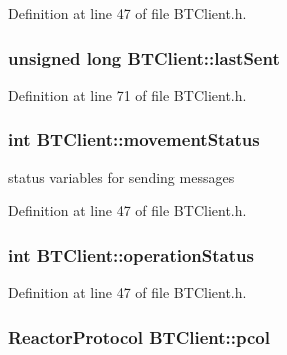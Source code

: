 Definition at line 47 of file B\-T\-Client.\-h.

\hypertarget{classBTClient_a946cc60b431ec813642b97b0c4b76cf3}{
\subsubsection[{last\-Sent}]{\setlength{\rightskip}{0pt plus 5cm}unsigned long B\-T\-Client\-::last\-Sent\hspace{0.3cm}{\ttfamily [private]}}}\label{classBTClient_a946cc60b431ec813642b97b0c4b76cf3}


Definition at line 71 of file B\-T\-Client.\-h.

\hypertarget{classBTClient_aacff467239e0a6a85eab0ac77dbcfdf8}{
\subsubsection[{movement\-Status}]{\setlength{\rightskip}{0pt plus 5cm}int B\-T\-Client\-::movement\-Status}}\label{classBTClient_aacff467239e0a6a85eab0ac77dbcfdf8}


status variables for sending messages 



Definition at line 47 of file B\-T\-Client.\-h.

\hypertarget{classBTClient_a419405603d661e07e630a6649e9592a0}{
\subsubsection[{operation\-Status}]{\setlength{\rightskip}{0pt plus 5cm}int B\-T\-Client\-::operation\-Status}}\label{classBTClient_a419405603d661e07e630a6649e9592a0}


Definition at line 47 of file B\-T\-Client.\-h.

\hypertarget{classBTClient_a64bd4b5e464d0b6a57957428ef559142}{
\subsubsection[{pcol}]{\setlength{\rightskip}{0pt plus 5cm}Reactor\-Protocol B\-T\-Client\-::pcol\hspace{0.3cm}{\ttfamily [private]}}}\label{classBTClient_a64bd4b5e464d0b6a57957428ef559142}


